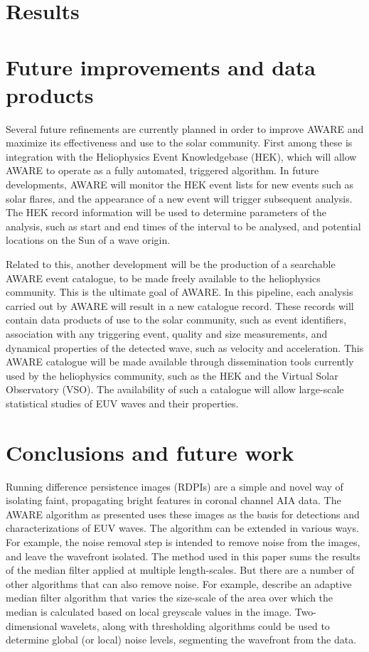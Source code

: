 \documentclass[namedreferences]{solarphysics}
\begin{document}
\begin{article}
\section{Results}\label{sec:results}

\section{Future improvements and data products}\label{sec:future}

Several future refinements are currently planned in order to improve
AWARE and maximize its effectiveness and use to the solar
community. First among these is integration with the Heliophysics
Event Knowledgebase (HEK), which will allow AWARE to operate as a
fully automated, triggered algorithm. In future developments, AWARE
will monitor the HEK event lists for new events such as solar flares,
and the appearance of a new event will trigger subsequent
analysis. The HEK record information will be used to determine
parameters of the analysis, such as start and end times of the
interval to be analysed, and potential locations on the Sun of a wave
origin.

Related to this, another development will be the production of a
searchable AWARE event catalogue, to be made freely available to the
heliophysics community. This is the ultimate goal of AWARE. In this
pipeline, each analysis carried out by AWARE will result in a new
catalogue record. These records will contain data products of use to
the solar community, such as event identifiers, association with any
triggering event, quality and size measurements, and dynamical
properties of the detected wave, such as velocity and
acceleration. This AWARE catalogue will be made available through
dissemination tools currently used by the heliophysics community, such
as the HEK and the Virtual Solar Observatory (VSO). The availability
of such a catalogue will allow large-scale statistical studies of EUV
waves and their properties.

\section{Conclusions and future work}\label{sec:conclusions}

Running difference persistence images (RDPIs) are a simple and novel
way of isolating faint, propagating bright features in coronal channel
AIA data.  The AWARE algorithm as presented uses these images as the
basis for detections and characterizations of EUV waves.  The
algorithm can be extended in various ways.  For example, the noise
removal step is intended to remove noise from the images, and leave
the wavefront isolated.  The method used in this paper sums the
results of the median filter applied at multiple length-scales.  But
there are a number of other algorithms that can also remove noise.
For example, \citet{2002dip..book.....G} describe an adaptive median
filter algorithm that varies the size-scale of the area over which
the median is calculated based on local greyscale values in the
image. Two-dimensional wavelets, along with thresholding algorithms
could be used to determine global (or local) noise levels, segmenting
the wavefront from the data.


\end{article}
\end{document}
